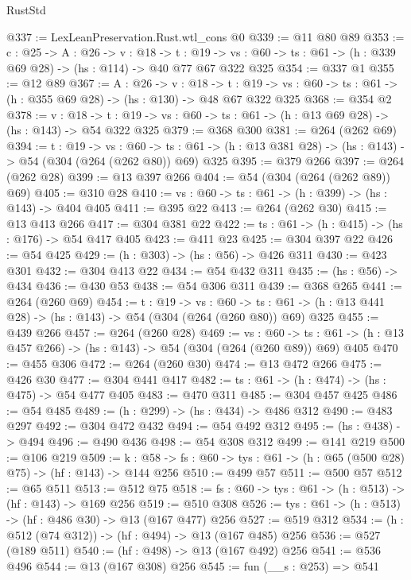\begin{lexlean}{RustStd}
\begin{coremodule}
@337 := LexLeanPreservation.Rust.wtl_cons @0
@339 := @11 @80 @89
@353 := {c : @25} ->
  {A : @26} ->
  {v : @18} ->
  {t : @19} ->
  {vs : @60} -> {ts : @61} -> (h : @339 @69 @28) -> (hs : @114) -> @40 @77 @67 @322 @325
@354 := @337 @1
@355 := @12 @89
@367 := {A : @26} ->
  {v : @18} ->
  {t : @19} -> {vs : @60} -> {ts : @61} -> (h : @355 @69 @28) -> (hs : @130) -> @48 @67 @322 @325
@368 := @354 @2
@378 := {v : @18} ->
  {t : @19} -> {vs : @60} -> {ts : @61} -> (h : @13 @69 @28) -> (hs : @143) -> @54 @322 @325
@379 := @368 @300
@381 := @264 (@262 @69)
@394 := {t : @19} ->
  {vs : @60} ->
  {ts : @61} -> (h : @13 @381 @28) -> (hs : @143) -> @54 (@304 (@264 (@262 @80)) @69) @325
@395 := @379 @266
@397 := @264 (@262 @28)
@399 := @13 @397 @266
@404 := @54 (@304 (@264 (@262 @89)) @69)
@405 := @310 @28
@410 := {vs : @60} -> {ts : @61} -> (h : @399) -> (hs : @143) -> @404 @405
@411 := @395 @22
@413 := @264 (@262 @30)
@415 := @13 @413 @266
@417 := @304 @381 @22
@422 := {ts : @61} -> (h : @415) -> (hs : @176) -> @54 @417 @405
@423 := @411 @23
@425 := @304 @397 @22
@426 := @54 @425
@429 := (h : @303) -> (hs : @56) -> @426 @311
@430 := @423 @301
@432 := @304 @413 @22
@434 := @54 @432 @311
@435 := (hs : @56) -> @434
@436 := @430 @53
@438 := @54 @306 @311
@439 := @368 @265
@441 := @264 (@260 @69)
@454 := {t : @19} ->
  {vs : @60} ->
  {ts : @61} -> (h : @13 @441 @28) -> (hs : @143) -> @54 (@304 (@264 (@260 @80)) @69) @325
@455 := @439 @266
@457 := @264 (@260 @28)
@469 := {vs : @60} ->
  {ts : @61} -> (h : @13 @457 @266) -> (hs : @143) -> @54 (@304 (@264 (@260 @89)) @69) @405
@470 := @455 @306
@472 := @264 (@260 @30)
@474 := @13 @472 @266
@475 := @426 @30
@477 := @304 @441 @417
@482 := {ts : @61} -> (h : @474) -> (hs : @475) -> @54 @477 @405
@483 := @470 @311
@485 := @304 @457 @425
@486 := @54 @485
@489 := (h : @299) -> (hs : @434) -> @486 @312
@490 := @483 @297
@492 := @304 @472 @432
@494 := @54 @492 @312
@495 := (hs : @438) -> @494
@496 := @490 @436
@498 := @54 @308 @312
@499 := @141 @219
@500 := @106 @219
@509 := {k : @58} ->
  {fs : @60} -> {tys : @61} -> (h : @65 (@500 @28) @75) -> (hf : @143) -> @144 @256
@510 := @499 @57
@511 := @500 @57
@512 := @65 @511
@513 := @512 @75
@518 := {fs : @60} -> {tys : @61} -> (h : @513) -> (hf : @143) -> @169 @256
@519 := @510 @308
@526 := {tys : @61} -> (h : @513) -> (hf : @486 @30) -> @13 (@167 @477) @256
@527 := @519 @312
@534 := (h : @512 (@74 @312)) -> (hf : @494) -> @13 (@167 @485) @256
@536 := @527 (@189 @511)
@540 := (hf : @498) -> @13 (@167 @492) @256
@541 := @536 @496
@544 := @13 (@167 @308) @256
@545 := fun (__s : @253) => @541

\end{coremodule}
\end{lexlean}
